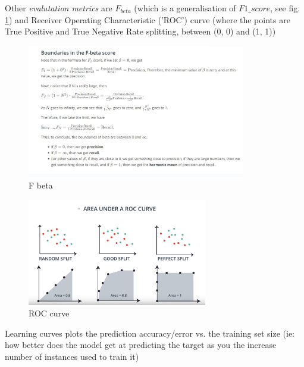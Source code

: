 \documentclass[12pt]{article}
\begin{document}
Other \textit{evalutation metrics} are $F_{beta}$ (which is a generalisation of  $F1\_score$, see fig. \ref{F_beta_boundaries}) and Receiver Operating Characteristic ('ROC') curve (where the points are True Positive and True Negative Rate splitting, between (0, 0) and (1, 1))
\begin{figure}[htbp] 
	\centering
	\includegraphics[width=0.85\textwidth]{pics/F_beta_boundaries}
	\caption{F beta}  
	\label{F_beta_boundaries}
\end{figure}

\begin{figure}[htbp] 
	\centering
	\includegraphics[width=0.7\textwidth]{pics/ROC_curve}
	\caption{ROC curve}  
	\label{ROC_curve}
\end{figure}

Learning curves plots the prediction accuracy/error vs. the training set size (ie: how better does the model get at predicting the target as you the increase number of instances used to train it)
\end{document}
